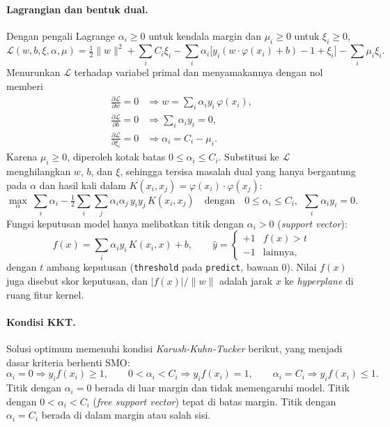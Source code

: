 \paragraph{Lagrangian dan bentuk dual.} Dengan pengali Lagrange $\alpha_i \ge 0$ untuk kendala margin dan $\mu_i \ge 0$ untuk $\xi_i \ge 0$,
\begin{equation}
	\mathcal{L}(w, b, \xi, \alpha, \mu) = \tfrac{1}{2}\lVert w\rVert^2 + \sum_i C_i\xi_i - \sum_i \alpha_i\big[y_i(w \cdot \varphi(x_i) + b) - 1 + \xi_i\big] - \sum_i \mu_i\xi_i .
	\label{eq:svm-lagrangian}
\end{equation}
Menurunkan $\mathcal{L}$ terhadap variabel primal dan menyamakannya dengan nol memberi
\begin{align}
	\frac{\partial \mathcal{L}}{\partial w} = 0 &\Rightarrow w = \sum_i \alpha_i y_i\,\varphi(x_i), \\
	\frac{\partial \mathcal{L}}{\partial b} = 0 &\Rightarrow \sum_i \alpha_i y_i = 0, \\
	\frac{\partial \mathcal{L}}{\partial \xi_i} = 0 &\Rightarrow \alpha_i = C_i - \mu_i .
\end{align}
Karena $\mu_i \ge 0$, diperoleh kotak batas $0 \le \alpha_i \le C_i$. Substitusi ke $\mathcal{L}$ menghilangkan $w$, $b$, dan $\xi$, sehingga tersisa masalah dual yang hanya bergantung pada $\alpha$ dan hasil kali dalam $K(x_i, x_j) = \varphi(x_i)\cdot\varphi(x_j)$:
\begin{equation}
	\max_{\alpha}\ \sum_{i} \alpha_i - \tfrac{1}{2}\sum_{i}\sum_{j} \alpha_i\alpha_j\,y_i y_j\,K(x_i, x_j)
	\quad \text{dengan} \quad 0 \le \alpha_i \le C_i,\ \ \sum_i \alpha_i y_i = 0 .
	\label{eq:svm-dual}
\end{equation}
Fungsi keputusan model hanya melibatkan titik dengan $\alpha_i > 0$ (\textit{support vector}):
\begin{equation}
	f(x) = \sum_{i} \alpha_i y_i\,K(x_i, x) + b, \qquad \hat{y} = \begin{cases} +1 & f(x) > t \\ -1 & \text{lainnya,} \end{cases}
	\label{eq:svm-decision}
\end{equation}
dengan $t$ ambang keputusan (\texttt{threshold} pada \texttt{predict}, bawaan 0). Nilai $f(x)$ juga disebut skor keputusan, dan $|f(x)|/\lVert w\rVert$ adalah jarak $x$ ke \textit{hyperplane} di ruang fitur kernel.

\paragraph{Kondisi KKT.} Solusi optimum memenuhi kondisi \textit{Karush-Kuhn-Tucker} berikut, yang menjadi dasar kriteria berhenti SMO:
\begin{equation}
	\alpha_i = 0 \Rightarrow y_i f(x_i) \ge 1, \qquad
	0 < \alpha_i < C_i \Rightarrow y_i f(x_i) = 1, \qquad
	\alpha_i = C_i \Rightarrow y_i f(x_i) \le 1 .
	\label{eq:svm-kkt}
\end{equation}
Titik dengan $\alpha_i = 0$ berada di luar margin dan tidak memengaruhi model. Titik dengan $0 < \alpha_i < C_i$ (\textit{free support vector}) tepat di batas margin. Titik dengan $\alpha_i = C_i$ berada di dalam margin atau salah sisi.

